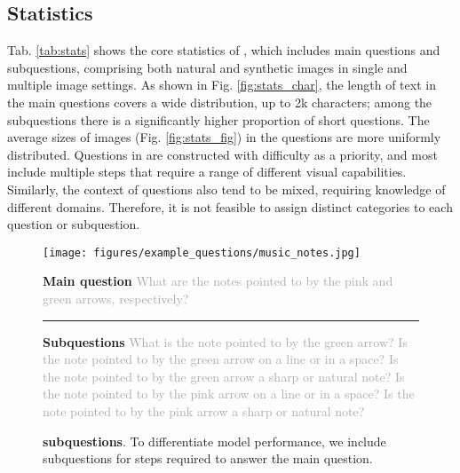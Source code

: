 \subsection{Statistics}

Tab. \ref{tab:stats} shows the core statistics of \benchmarkName, which includes \nquestions main questions and \nsubquestions subquestions, comprising both natural and synthetic images in single and multiple image settings. As shown in Fig. \ref{fig:stats_char}, the length of text in the main questions covers a wide distribution, up to 2k characters; among the subquestions there is a significantly higher proportion of short questions. The average sizes of images (Fig. \ref{fig:stats_fig}) in the questions are more uniformly distributed. %
Questions in \benchmarkName are constructed with difficulty as a priority, and most include multiple steps that require a range of different visual capabilities. Similarly, the context of questions also tend to be mixed, requiring knowledge of different domains. Therefore, it is not feasible to assign distinct categories to each question or subquestion.











\begin{figure}[t]
\centering
\texttt{[image: figures/example\_questions/music\_notes.jpg]}

\vspace{-0.3cm}
\begin{tcolorbox}[colframe=black, colback=gray!10, boxrule=0.4mm, boxsep=3pt,left=3pt,right=3pt,top=3pt,bottom=3pt]
\scriptsize{\textbf{Main question}}\newline
    \scriptsize{\textcolor{darkgray}{What are the notes pointed to by the pink and green arrows, respectively?}}\newline
    \vspace{-1mm}
\hrule
    \vspace{1mm}
    \scriptsize{\textbf{Subquestions}}\newline
    \scriptsize{\textcolor{darkgray}{What is the note pointed to by the green arrow?}}\newline
    \scriptsize{\textcolor{darkgray}{Is the note pointed to by the green arrow on a line or in a space?}}\newline
     \scriptsize{\textcolor{darkgray}{Is the note pointed to by the green arrow a sharp or natural note?}}\newline
    \scriptsize{\textcolor{darkgray}{Is the note pointed to by the pink arrow on a line or in a space?}}\newline
     \scriptsize{\textcolor{darkgray}{Is the note pointed to by the pink arrow a sharp or natural note?}}
\end{tcolorbox}
\vspace{-4mm}
\caption{\textbf{\benchmarkName subquestions}. To differentiate model performance, we include subquestions for steps required to answer the main question.}
\label{fig:example_subquestions}
\end{figure}
